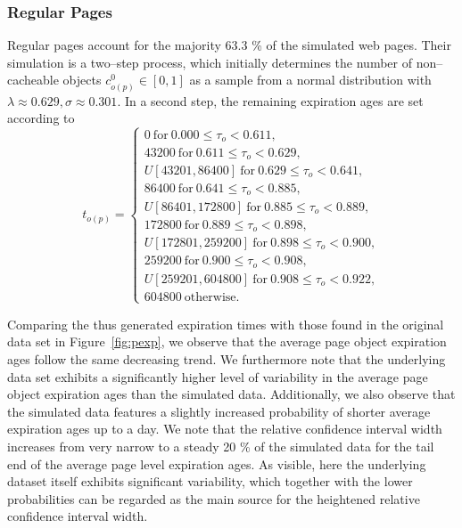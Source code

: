 \documentclass[letterpaper,conference]{IEEEtran}
\begin{document}
\subsubsection{Regular Pages}
Regular pages account for the majority 63.3 \% of the simulated web pages. 
Their simulation is a two--step process, which initially determines the number of non--cacheable objects $c^0_{o(p)} \in [0,1]$ as a sample from a normal distribution with $\lambda \approx 0.629, \sigma \approx 0.301$.
In a second step, the remaining expiration ages are set according to 
\begin{equation*}
t_{o(p)} =
\begin{cases}
	0	~\mathrm{for}~	0.000	\le \tau_o <	0.611,                \\
	43200	~\mathrm{for}~	0.611	\le \tau_o <	0.629,            \\
	U[43201,86400]	~\mathrm{for}~	0.629	\le \tau_o <	0.641,   \\
	86400	~\mathrm{for}~	0.641	\le \tau_o <	0.885,            \\
	U[86401,172800]	~\mathrm{for}~	0.885	\le \tau_o <	0.889,  \\
	172800	~\mathrm{for}~	0.889	\le \tau_o <	0.898,           \\
	U[172801,259200]	~\mathrm{for}~	0.898	\le\tau_o <	0.900, \\
	259200	~\mathrm{for}~	0.900	\le \tau_o <	0.908,          \\
	U[259201,604800]	~\mathrm{for}~	0.908	\le \tau_o <	0.922, \\
	604800	~\mathrm{otherwise}.
\end{cases}
\end{equation*}

Comparing the thus generated expiration times with those found in the original data set in Figure~\ref{fig:pexp}, we observe that the average page object expiration ages follow the same decreasing trend.
We furthermore note that the underlying data set exhibits a significantly higher level of variability in the average page object expiration ages than the simulated data. 
Additionally, we also observe that the simulated data features a slightly increased probability of shorter average expiration ages up to a day.
We note that the relative confidence interval width increases from very narrow to a steady 20 \% of the simulated data 
for the tail end of the average page level expiration ages. 
As visible, here the underlying dataset itself exhibits significant variability, which together with the lower probabilities can be regarded as the main source for the heightened relative confidence interval width.
\end{document}
